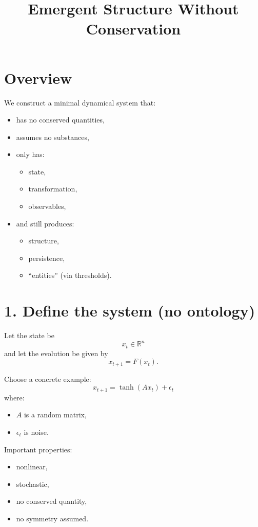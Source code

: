 \documentclass[11pt]{article}
\title{Emergent Structure Without Conservation}
\author{}
\date{}
\begin{document}
\maketitle

\section*{Overview}

We construct a minimal dynamical system that:

\begin{itemize}[leftmargin=2em]
    \item has no conserved quantities,
    \item assumes no substances,
    \item only has:
    \begin{itemize}
        \item state,
        \item transformation,
        \item observables,
    \end{itemize}
    \item and still produces:
    \begin{itemize}
        \item structure,
        \item persistence,
        \item ``entities'' (via thresholds).
    \end{itemize}
\end{itemize}

\section*{1. Define the system (no ontology)}

Let the state be
\[
x_t \in \mathbb{R}^n
\]
and let the evolution be given by
\[
x_{t+1} = F(x_t).
\]

Choose a concrete example:
\[
x_{t+1} = \tanh(Ax_t) + \epsilon_t
\]
where:
\begin{itemize}[leftmargin=2em]
    \item \(A\) is a random matrix,
    \item \(\epsilon_t\) is noise.
\end{itemize}

Important properties:
\begin{itemize}[leftmargin=2em]
    \item nonlinear,
    \item stochastic,
    \item no conserved quantity,
    \item no symmetry assumed.
\end{itemize}
\end{document}
